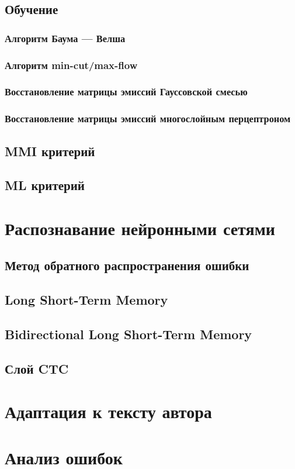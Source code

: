 \subsection{Обучение}
\cite{tay2002offline}

\subsubsection{Алгоритм Баума — Велша}
\subsubsection{Алгоритм min-cut/max-flow}
\subsubsection{Восстановление матрицы эмиссий Гауссовской смесью}
\subsubsection{Восстановление матрицы эмиссий многослойным перцептроном}
\subsection{MMI критерий}
\subsection{ML критерий}

\section{Распознавание нейронными сетями}
\subsection{Метод обратного распространения ошибки}
\subsection{Long Short-Term Memory}
\subsection{Bidirectional Long Short-Term Memory}
\subsection{Слой CTC}

\section{Адаптация к тексту автора}

\section{Анализ ошибок}


